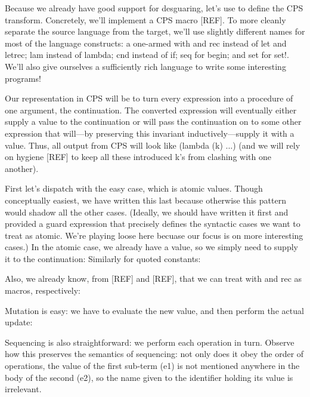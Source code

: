 
Because we already have good support for desguaring, let’s use to define the CPS
transform. Concretely, we’ll implement a CPS macro [REF]. To more cleanly
separate the source language from the target, we’ll use slightly different names
for most of the language constructs: a one-armed with and rec instead of let and
letrec; lam instead of lambda; cnd instead of if; seq for begin; and set for
set!. We’ll also give ourselves a sufficiently rich language to write some
interesting programs!

Our representation in CPS will be to turn every expression into a procedure of
one argument, the continuation. The converted expression will eventually either
supply a value to the continuation or will pass the continuation on to some
other expression that will—by preserving this invariant inductively—supply it
with a value. Thus, all output from CPS will look like (lambda (k) ...) (and we
will rely on hygiene [REF] to keep all these introduced k’s from clashing with
one another).

First let’s dispatch with the easy case, which is atomic values. Though
conceptually easiest, we have written this last because otherwise this pattern
would shadow all the other cases. (Ideally, we should have written it first and
provided a guard expression that precisely defines the syntactic cases we want
to treat as atomic. We’re playing loose here becuase our focus is on more
interesting cases.) In the atomic case, we already have a value, so we simply
need to supply it to the continuation:
Similarly for quoted constants:

Also, we already know, from [REF] and [REF], that we can treat with and rec as
macros, respectively:

Mutation is easy: we have to evaluate the new value, and then perform the actual
update:

Sequencing is also straightforward: we perform each operation in turn. Observe
how this preserves the semantics of sequencing: not only does it obey the order
of operations, the value of the first sub-term (e1) is not mentioned anywhere in
the body of the second (e2), so the name given to the identifier holding its
value is irrelevant.

